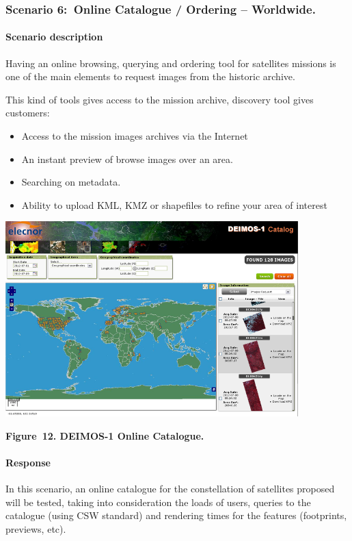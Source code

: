 \documentclass[a4paper]{article}
\newcommand\liststyleLFOxvii{%
\renewcommand\labelitemi{[F0B7?]}
\renewcommand\labelitemii{o}
\renewcommand\labelitemiii{[F0A7?]}
\renewcommand\labelitemiv{[F0B7?]}
}
\begin{document}
\bigskip

\clearpage
\bigskip

\subsubsection[Scenario 6:\ Online Catalogue / Ordering {}--
Worldwide.\ ]{Scenario 6:\ Online Catalogue / Ordering -- Worldwide.\ }
\hypertarget{Toc381777199}{}\paragraph[Scenario description]{Scenario
description}
Having an online browsing, querying and ordering tool for satellites
missions is one of the main elements to request images from the
historic archive.\ 

This kind of tools gives access to the mission archive, discovery tool
gives customers:

\liststyleLFOxvii
\begin{itemize}
\item Access to the mission images archives via the Internet
\item An instant preview of browse images over an area.
\item Searching on metadata.
\item Ability to upload KML, KMZ or shapefiles to refine your area of
interest
\end{itemize}
{\centering 
\includegraphics[width=4.46297in,height=2.96407in]{out-img16.png} \par}

{\centering\bfseries
Figure\ 12. DEIMOS-1 Online Catalogue.
\par}

\paragraph[Response]{ Response}
In this scenario, an online catalogue for the constellation of
satellites proposed will be tested, taking into consideration the loads
of users, queries to the catalogue (using CSW standard) and rendering
times for the features (footprints, previews, etc).
\end{document}
